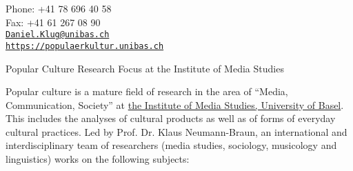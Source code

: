 \documentclass[9pt]{article}
\makeatletter
\def\myemail{Daniel.Klug@unibas.ch}
\def\mywebtext{https://populaerkultur.unibas.ch}
\def\myweb{https://populaerkultur.unibas.ch/home/popularculture-en/}
\def\myfax{+41 61 267 08 90}
\def\myphone{+41 78 696 40 58}
\makeatother
\begin{document}
\begin{minipage}[t]{2.95in}

\end{minipage}
\hfill
\hfill
\begin{minipage}[t]{1.7in}
  \flushright \footnotesize Phone: \myphone \\
  Fax: \myfax  \\
  {\scriptsize  \texttt{\href{mailto:\myemail}{\myemail}}} \\
  {\scriptsize  \vspace{-0.03in} \texttt{\href{\myweb}{\mywebtext}}}
\end{minipage}


\medskip

\reversemarginpar

\bigskip\bigskip



\noindent\textsf{\large Popular Culture Research Focus at the Institute of Media Studies}
\smallskip

\noindent Popular culture is a mature field of research in the area of ``Media, Communication, Society'' at \href{http://mewi.unibas.ch/}{the Institute of Media Studies, University of Basel}. This includes the analyses of cultural products as well as of forms of everyday cultural practices. Led by Prof. Dr. Klaus Neumann-Braun, an international and interdisciplinary team of researchers (media studies, sociology, musicology and linguistics) works on the following subjects:
\end{document}

